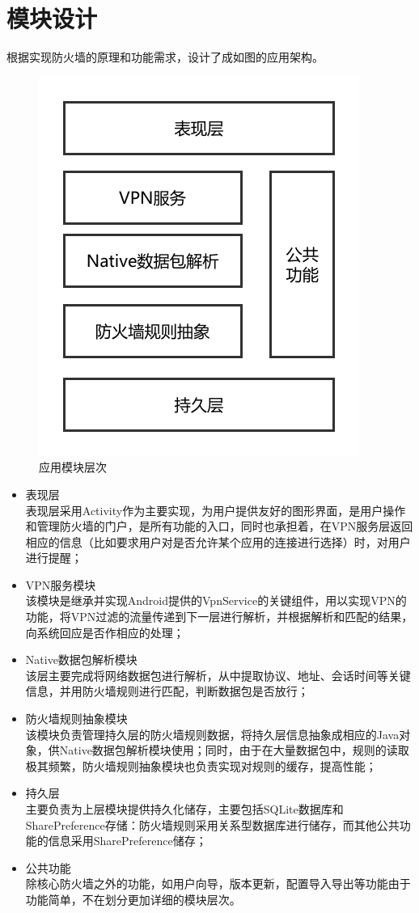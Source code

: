 \documentclass{article}
\begin{document}
\section{模块设计}

根据实现防火墙的原理和功能需求，设计了成如图的应用架构。

\begin{figure}[!h]
\centering
\includegraphics[width=.6\textwidth]{modules.pdf}
\caption{应用模块层次}\label{fig:5}
\end{figure}

\begin{itemize}
	\item 表现层\\ 表现层采用Activity作为主要实现，为用户提供友好的图形界面，是用户操作和管理防火墙的门户，是所有功能的入口，同时也承担着，在VPN服务层返回相应的信息（比如要求用户对是否允许某个应用的连接进行选择）时，对用户进行提醒；
	\item VPN服务模块\\该模块是继承并实现Android提供的VpnService的关键组件，用以实现VPN的功能，将VPN过滤的流量传递到下一层进行解析，并根据解析和匹配的结果，向系统回应是否作相应的处理；
	\item Native数据包解析模块\\该层主要完成将网络数据包进行解析，从中提取协议、地址、会话时间等关键信息，并用防火墙规则进行匹配，判断数据包是否放行；
	\item 防火墙规则抽象模块\\该模块负责管理持久层的防火墙规则数据，将持久层信息抽象成相应的Java对象，供Native数据包解析模块使用；同时，由于在大量数据包中，规则的读取极其频繁，防火墙规则抽象模块也负责实现对规则的缓存，提高性能；
	\item 持久层\\主要负责为上层模块提供持久化储存，主要包括SQLite数据库和SharePreference存储：防火墙规则采用关系型数据库进行储存，而其他公共功能的信息采用SharePreference储存；
	\item 公共功能\\除核心防火墙之外的功能，如用户向导，版本更新，配置导入导出等功能由于功能简单，不在划分更加详细的模块层次。
\end{itemize}
\end{document}
